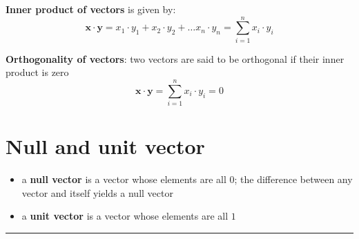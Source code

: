 \documentclass[
]{book}
\providecommand{\tightlist}{%
  \setlength{\itemsep}{0pt}\setlength{\parskip}{0pt}}
\theoremstyle{definition}
\theoremstyle{definition}
\theoremstyle{definition}
\theoremstyle{remark}
\begin{document}
\textbf{Inner product of vectors} is given by: \[\mathbf{x} \cdot \mathbf{y} = x_1 \cdot y_1 + x_2 \cdot y_2 + \dots x_n \cdot y_n = \displaystyle\sum_{i=1}^{n}x_i\cdot y_i\]

\textbf{Orthogonality of vectors}: two vectors are said to be orthogonal if their inner product is zero \[\mathbf{x} \cdot \mathbf{y} =\displaystyle\sum_{i=1}^{n}x_i\cdot y_i = 0\]

\hypertarget{null-and-unit-vector}{%
\section{Null and unit vector}\label{null-and-unit-vector}}

\begin{itemize}
\tightlist
\item
  a \textbf{null vector} is a vector whose elements are all \(0\); the difference between any vector and itself yields a null vector
\item
  a \textbf{unit vector} is a vector whose elements are all \(1\)
\end{itemize}

\begin{center}\rule{0.5\linewidth}{0.5pt}\end{center}
\end{document}
